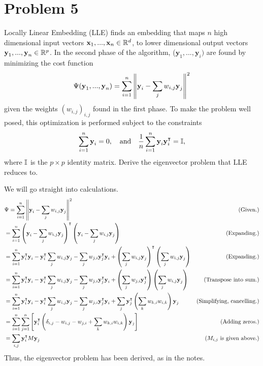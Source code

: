 \newcommand{\y}{\textbf{y}}

\newpage
\section{Problem 5}
Locally Linear Embedding (LLE) finds an embedding that maps $n$ high dimensional input vectors $\textbf{x}_1, ..., \textbf{x}_n \in \mathbb{R}^d$, to lower dimensional output vectors $\textbf{y}_1, ..., \textbf{y}_n \in \mathbb{R}^p$. In the second phase of the algorithm, ($\textbf{y}_1, ..., \textbf{y}_i)$ are found by minimizing the cost function
\[\Psi(\textbf{y}_1, ..., \textbf{y}_n) = \sum_{i = 1}^n \norm{\textbf{y}_i - \sum_{j} w_{i, j}\textbf{y}_j}^2\]
given the weights $(w_{i, j})_{i, j}$ found in the first phase. To make the problem well posed, this optimization is performed subject to the constraints 
\[\sum_{i = 1}^n \textbf{y}_i = 0, \quad \text{and} \quad \frac{1}{n}\sum_{i = 1}^n \textbf{y}_i \textbf{y}_i ^{\intercal} = \mathbb{I}, \]
where $\mathbb{I}$ is the $p\times p$ identity matrix. Derive the eigenvector problem that LLE reduces to.
\partbreak
\begin{solution}

    We will go straight into calculations.
    \tightalignbreak
    \begin{align*}
        &\Psi = \sum_{i = 1}^n \norm{\textbf{y}_i - \sum_j w_{i, j} \textbf{y}_j}^2 &\text{(Given.)}\\
        &= \sum_{i = 1}^n \left(\textbf{y}_i - \sum_j w_{i, j} \textbf{y}_j\right)\T \left(\textbf{y}_i - \sum_j w_{i, j} \textbf{y}_j\right) &\text{(Expanding.)}\\
        &= \sum_{i = 1}^n\y_i \T \y_i - \y_i\T \sum_j w_{i, j}\y_j - \sum_j w_{j, i}\y_j\T \y_i + \left(\sum_j w_{i, j}\y_j\right)\T\left(\sum_j w_{i, j}\y_j\right) &\text{(Expanding.)}\\
        &= \sum_{i = 1}^n\y_i \T \y_i - \y_i\T \sum_j w_{i, j}\y_j - \sum_j w_{j, i}\y_j\T \y_i + \left(\sum_j w_{j, i}\y_j\T\right)\left(\sum_j w_{i, j}\y_j\right) &\text{(Transpose into sum.)}\\
        &=  \sum_{i = 1}^n\y_i \T \y_i - \y_i\T \sum_j w_{i, j}\y_j - \sum_j w_{j, i}\y_j\T \y_i + \sum_j \y_j\T \left(\sum_k w_{k, i}w_{i, k}\right)\y_j &\text{(Simplifying, cancelling.)}\\
        &= \sum_{i = 1}^n \sum_{j = 1}^n \left[\y_i\T\left(\delta_{i, j} - w_{i, j} - w_{j, i} + \sum_k w_{k, i}w_{i, k}\right)\y_j\right] &\text{(Adding zeros.)}\\
        &= \sum_{i, j} \y_i\T M \y_j &\text{($M_{i, j}$ is given above.)}
    \end{align*}\vspace{-12mm}\alignbreak
    Thus, the eigenvector problem has been derived, as in the notes. 
\end{solution}
\newpage
